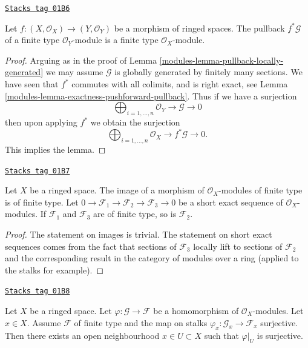 \begin{lemma}
\label{modules-lemma-pullback-finite-type}
\href{https://stacks.math.columbia.edu/tag/01B6}{\texttt{Stacks tag 01B6}}

Let $f : (X, \mathcal{O}_X) \to (Y, \mathcal{O}_Y)$
be a morphism of ringed spaces.
The pullback $f^*\mathcal{G}$ of a finite type
$\mathcal{O}_Y$-module is a finite type $\mathcal{O}_X$-module.
\end{lemma}

\begin{proof}

Arguing as in the proof of Lemma \ref{modules-lemma-pullback-locally-generated}
we may assume $\mathcal{G}$ is globally generated by finitely
many sections.
We have seen that $f^*$ commutes with all colimits,
and is right exact, see Lemma \ref{modules-lemma-exactness-pushforward-pullback}.
Thus if we have a surjection
$$
\bigoplus\nolimits_{i = 1, \ldots, n}
\mathcal{O}_Y
\to
\mathcal{G}
\to
0
$$
then upon applying $f^*$ we obtain the surjection
$$
\bigoplus\nolimits_{i = 1, \ldots, n}
\mathcal{O}_X
\to
f^*\mathcal{G}
\to
0.
$$
This implies the lemma.
\end{proof}

\begin{lemma}
\label{modules-lemma-extension-finite-type}
\href{https://stacks.math.columbia.edu/tag/01B7}{\texttt{Stacks tag 01B7}}

Let $X$ be a ringed space.
The image of a morphism of $\mathcal{O}_X$-modules of finite
type is of finite type.
Let
$0 \to \mathcal{F}_1 \to \mathcal{F}_2 \to \mathcal{F}_3 \to 0$
be a short exact sequence of $\mathcal{O}_X$-modules.
If $\mathcal{F}_1$ and $\mathcal{F}_3$ are of finite type,
so is $\mathcal{F}_2$.
\end{lemma}

\begin{proof}
The statement on images is trivial.
The statement on short exact sequences comes from the
fact that sections of $\mathcal{F}_3$ locally lift to sections
of $\mathcal{F}_2$ and the corresponding result in
the category of modules over a ring (applied to the stalks
for example).
\end{proof}

\begin{lemma}
\label{modules-lemma-finite-type-surjective-on-stalk}
\href{https://stacks.math.columbia.edu/tag/01B8}{\texttt{Stacks tag 01B8}}

Let $X$ be a ringed space.
Let $\varphi : \mathcal{G} \to \mathcal{F}$ be a homomorphism
of $\mathcal{O}_X$-modules.
Let $x \in X$. Assume $\mathcal{F}$ of finite type and
the map on stalks
$\varphi_x : \mathcal{G}_x \to \mathcal{F}_x$ surjective.
Then there exists an open neighbourhood
$x \in U \subset X$ such that $\varphi|_U$ is surjective.
\end{lemma}

